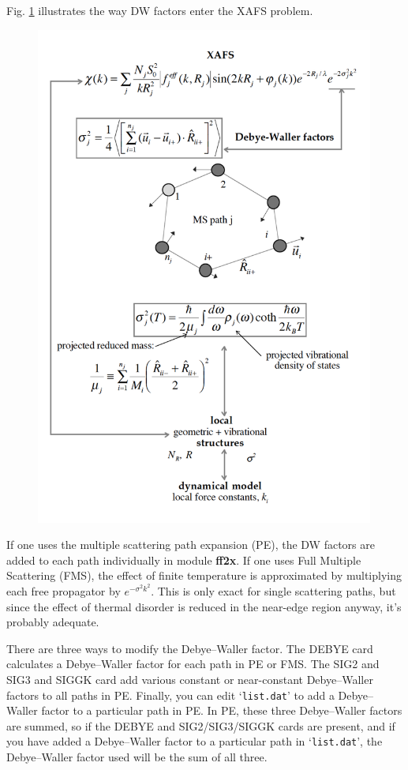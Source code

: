 \documentclass[11pt,oneside]{report} %
\renewcommand{\htmlref}[2]{\hyperlink{#2}{#1}}
\newcommand{\file}[1]{`\texttt{#1}'}
\newcommand{\module}[1]{\textrm{\bf{#1}}}
\renewcommand{\htmlref}[2]{{#1}} %
\begin{document}
Fig. \ref{fig:DWschema} illustrates the way DW factors enter the XAFS problem.

\begin{figure}[H]
	\centering
		\includegraphics[height=6.5in]{annafig1.pdf}
	\label{fig:DWschema}
\end{figure}



If one uses the multiple scattering path expansion (PE), the DW factors are added
to each path individually in module \module{ff2x}.  If one uses Full Multiple Scattering (FMS), the effect of finite temperature is approximated by multiplying each free propagator by $e^{-\sigma^{2}k^{2}}$.  This is only exact for single scattering paths, but since the effect of thermal disorder is reduced in the near-edge region anyway, it's probably adequate.

There are three ways to modify the Debye--Waller factor. The \htmlref{DEBYE}{card:deb2} card
calculates a Debye--Waller factor for each path in PE or FMS. The \htmlref{SIG2}{card:sig} and SIG3 and SIGGK card add
various constant or near-constant Debye--Waller factors to all paths in PE. Finally, you can edit \file{list.dat}
to add a Debye--Waller factor to a particular path in PE. In PE, these three
Debye--Waller factors are summed, so if the DEBYE and SIG2/SIG3/SIGGK cards are present,
and if you have added a Debye--Waller factor to a particular path in \file{list.dat}, the Debye--Waller factor 
used will be the sum of all three.  
\end{document}
